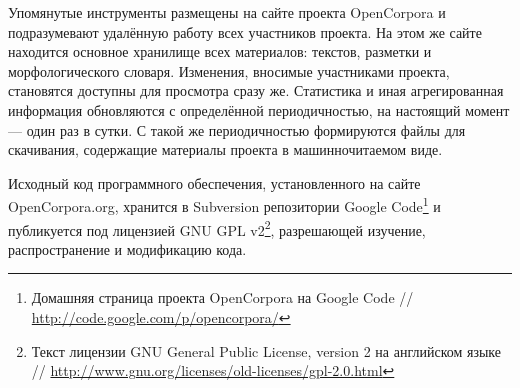 \documentclass[a4paper]{article}
\begin{document}
Упомянутые инструменты размещены на сайте проекта OpenCorpora и подразумевают удалённую работу всех участников проекта. На этом же сайте находится основное хранилище всех материалов: текстов, разметки и морфологического словаря. Изменения, вносимые участниками проекта, становятся доступны для просмотра сразу же. Статистика и иная агрегированная информация обновляются с определённой периодичностью, на настоящий момент — один раз в сутки. С такой же периодичностью формируются файлы для скачивания, содержащие материалы проекта в машинночитаемом виде.

Исходный код программного обеспечения, установленного на сайте OpenCorpora.org, хранится в Subversion репозитории Google Code\footnote{Домашняя страница проекта OpenCorpora на Google Code // \url{http://code.google.com/p/opencorpora/}} и публикуется под лицензией GNU GPL v2\footnote{Текст лицензии GNU General Public License, version 2 на английском языке // \url{http://www.gnu.org/licenses/old-licenses/gpl-2.0.html}}, разрешающей изучение, распространение и модификацию кода.
\end{document}
